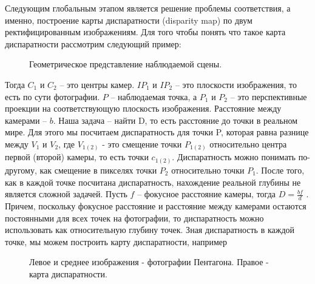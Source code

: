 Следующим глобальным этапом является решение проблемы 
соответствия, а именно, построение карты диспаратности (disparity map) по 
двум ректифицированным изображениям. Для того чтобы понять что такое 
карта диспаратности рассмотрим следующий пример:

\begin{figure}[h!]
\caption{Геометрическое представление наблюдаемой сцены.}
\label{pic:3}
\end{figure}

  Тогда $C_1$ и $C_2$ – это центры камер. $IP_1$ и $IP_2$ – это плоскости изображения, то 
есть по сути фотографии. $P$ – наблюдаемая точка, а $P_1$ и $P_2$ – это 
перспективные проекции на соответствующую плоскость изображения. 
Расстояние между камерами – $b$. Наша задача – найти D, то есть расстояние 
до точки в реальном мире. Для этого мы посчитаем диспаратность для точки 
P, которая равна разнице между $V_1$ и $V_2$, где $V_{1(2)}$ - это смещение точки $P_{1(2)}$ 
относительно центра первой (второй) камеры, то есть точки $c_{1(2)}$. 
Диспаратность можно понимать по-другому, как смещение в пикселях точки 
$P_2$ относительно точки $P_1$. После того, как в каждой точке посчитана
диспаратность, нахождение реальной глубины не является сложной задачей. 
Пусть $f$ – фокусное расстояние камеры, тогда $D = \frac {b   f} {d}$ . Причем, поскольку 
фокусное расстояние и расстояние между камерами остаются постоянными 
для всех точек на фотографии, то диспаратность можно использовать как 
относительную глубину точек. Зная диспаратность в каждой точке, мы 
можем построить карту диспаратности, например

\begin{figure}[h!]
\caption{Левое и среднее изображения - фотографии Пентагона. Правое - карта 
диспаратности.}
\label{pic:4}
\end{figure}

